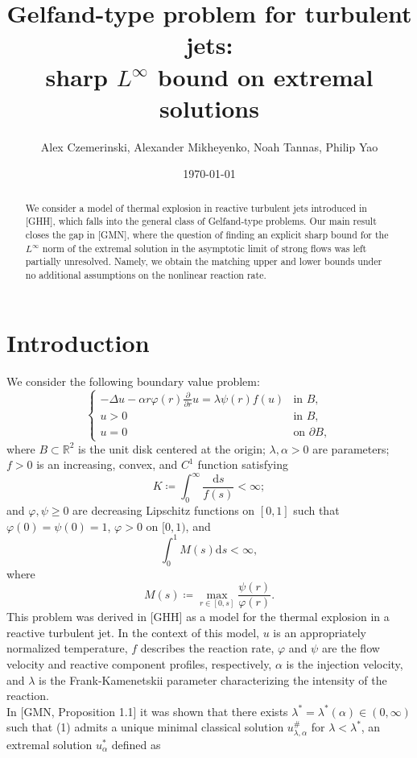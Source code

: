 \documentclass{article}
\title{Gelfand-type problem for turbulent jets: \\ sharp $L^\infty$ bound on extremal solutions}
\author{Alex Czemerinski, Alexander Mikheyenko, Noah Tannas, Philip Yao}
\date{\today}
\begin{document}
\maketitle
\begin{abstract}
    We consider a model of thermal explosion in reactive turbulent jets introduced in [GHH], which falls into the general class of Gelfand-type problems. Our main result closes the gap in [GMN], where the question of finding an explicit sharp bound for the $L^{\infty}$ norm of the extremal solution in the asymptotic limit of strong flows was left partially unresolved. Namely, we obtain the matching upper and lower bounds under no additional assumptions on the nonlinear reaction rate.
\end{abstract}
\section{Introduction}
We consider the following boundary value problem:
\begin{equation}
        \begin{cases}-\Delta u - \alpha r \varphi (r)\frac{\partial}{\partial r} u=\lambda \psi (r)f(u) &\text{in }B,
        \\ u>0 & \text{in }B,
        \\ u=0 & \text{on }\partial B,
        \end{cases}
    \end{equation}
    where $B\subset \mathbb R^2$ is the unit disk centered at the origin; $\lambda,\alpha>0$ are parameters; $f>0$ is an increasing, convex, and $C^1$ function satisfying
    \[K\coloneqq\int_0^\infty \frac{\mathrm{d}s}{f(s)}<\infty;\]
    and $\varphi,\psi\geq 0$ are decreasing Lipschitz functions on $[0,1]$ such that $\varphi(0)=\psi(0) = 1$, $\varphi>0$ on $[0,1)$, and 
    \[\int_0^1 M(s)\mathrm{d}s < \infty,\]
    where
    \[M(s) \coloneqq \max_{r\in[0,s]}\frac{\psi(r)}{\varphi(r)}.\]
    This problem was derived in [GHH] as a model for the thermal explosion in a reactive turbulent jet. In the context of this model, $u$ is an appropriately normalized temperature, $f$ describes the reaction rate, $\varphi$ and $\psi$ are the flow velocity and reactive component profiles, respectively, $\alpha$ is the injection velocity, and $\lambda$ is the Frank-Kamenetskii parameter characterizing the intensity of the reaction. \\ \newline 
    In [GMN, Proposition 1.1] it was shown that there exists $\lambda^* = \lambda^*(\alpha)\in(0,\infty)$ such that (1) admits a unique minimal classical solution $u^\#_{\lambda,\alpha}$ for $\lambda <\lambda^*$, an extremal solution $u^*_\alpha$ defined as
\end{document}
